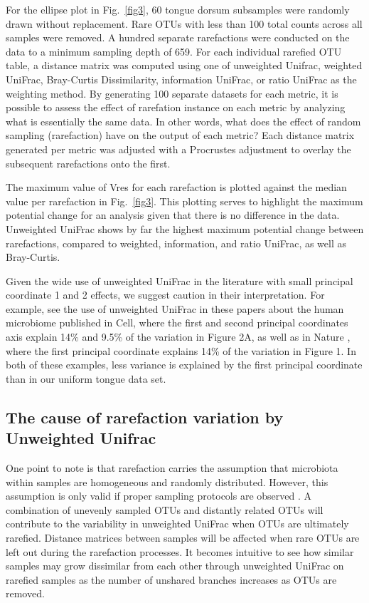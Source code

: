 \documentclass[10pt,letterpaper]{article}
\begin{document}
For the ellipse plot in Fig.~\ref{fig3}, 60 tongue dorsum subsamples were randomly drawn without replacement. Rare OTUs with less than 100 total counts across all samples were removed. A hundred separate rarefactions were conducted on the data to a minimum sampling depth of 659. For each individual rarefied OTU table, a distance matrix was computed using one of unweighted Unifrac, weighted UniFrac, Bray-Curtis Dissimilarity, information UniFrac, or ratio UniFrac as the weighting method. By generating 100 separate datasets for each metric, it is possible to assess the effect of rarefation instance on each metric by analyzing what is essentially the same data. In other words, what does the effect of random sampling (rarefaction) have on the output of each metric? Each distance matrix generated per metric was adjusted with a Procrustes adjustment to overlay the subsequent rarefactions onto the first.

The maximum value of Vres for each rarefaction is plotted against the median value per rarefaction in Fig.~\ref{fig3}. This plotting serves to highlight the maximum potential change for an analysis given that there is no difference in the data. Unweighted UniFrac shows by far the highest maximum potential change between rarefactions, compared to weighted, information, and ratio UniFrac, as well as Bray-Curtis.

Given the wide use of unweighted UniFrac in the literature with small principal coordinate 1 and 2 effects, we suggest caution in their interpretation. For example, see the use of unweighted UniFrac in these papers about the human microbiome published in Cell\cite{hsiao2013microbiota}, where the first and second principal coordinates axis explain 14\% and 9.5\% of the variation in Figure 2A, as well as in Nature \cite{sonnenburg2016diet}, where the first principal coordinate explains 14\% of the variation in Figure 1. In both of these examples, less variance is explained by the first principal coordinate than in our uniform tongue data set.

\FloatBarrier

\subsection{The cause of rarefaction variation by Unweighted Unifrac}
One point to note is that rarefaction carries the assumption that microbiota within samples are homogeneous and randomly distributed. However, this assumption is only valid if proper sampling protocols are observed \cite{gorzelak2015methods}. A combination of unevenly sampled OTUs and distantly related OTUs will contribute to the variability in unweighted UniFrac when OTUs are ultimately rarefied. Distance matrices between samples will be affected when rare OTUs are left out during the rarefaction processes. It becomes intuitive to see how similar samples may grow dissimilar from each other through unweighted UniFrac on rarefied samples as the number of unshared branches increases as OTUs are removed.
\end{document}
